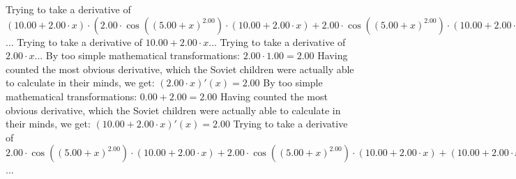 \documentclass{article}
\begin{document}
Trying to take a derivative of ${\left({{10.00} + {{2.00} \cdot {x}}}\right) \cdot \left({{{2.00} \cdot { \cos {\left({\left({{5.00} + {x}}\right) ^ {2.00}}\right)}  \cdot \left({{10.00} + {{2.00} \cdot {x}}}\right)}} + {{{2.00} \cdot { \cos {\left({\left({{5.00} + {x}}\right) ^ {2.00}}\right)}  \cdot \left({{10.00} + {{2.00} \cdot {x}}}\right)}} + {\left({{10.00} + {{2.00} \cdot {x}}}\right) \cdot \left({{\left({-1.00}\right) \cdot {\left({{10.00} + {{2.00} \cdot {x}}}\right) \cdot {\left({{10.00} + {{2.00} \cdot {x}}}\right) \cdot  \sin {\left({\left({{5.00} + {x}}\right) ^ {2.00}}\right)} }}} + {{2.00} \cdot  \cos {\left({\left({{5.00} + {x}}\right) ^ {2.00}}\right)} }}\right)}}}\right)}$...\newline
\newline
Trying to take a derivative of ${{10.00} + {{2.00} \cdot {x}}}$...\newline
\newline
Trying to take a derivative of ${{2.00} \cdot {x}}$...\newline
\newline
By too simple mathematical transformations:
 ${{2.00} \cdot {1.00}} = {2.00}$ 
 \newline
 \newline 
Having counted the most obvious derivative, which the Soviet children were actually able to calculate in their minds, we get:
$({{2.00} \cdot {x}})'(x) = {2.00}$\newline
\newline
By too simple mathematical transformations:
 ${{0.00} + {2.00}} = {2.00}$ 
 \newline
 \newline 
Having counted the most obvious derivative, which the Soviet children were actually able to calculate in their minds, we get:
$({{10.00} + {{2.00} \cdot {x}}})'(x) = {2.00}$\newline
\newline
Trying to take a derivative of ${{{2.00} \cdot { \cos {\left({\left({{5.00} + {x}}\right) ^ {2.00}}\right)}  \cdot \left({{10.00} + {{2.00} \cdot {x}}}\right)}} + {{{2.00} \cdot { \cos {\left({\left({{5.00} + {x}}\right) ^ {2.00}}\right)}  \cdot \left({{10.00} + {{2.00} \cdot {x}}}\right)}} + {\left({{10.00} + {{2.00} \cdot {x}}}\right) \cdot \left({{\left({-1.00}\right) \cdot {\left({{10.00} + {{2.00} \cdot {x}}}\right) \cdot {\left({{10.00} + {{2.00} \cdot {x}}}\right) \cdot  \sin {\left({\left({{5.00} + {x}}\right) ^ {2.00}}\right)} }}} + {{2.00} \cdot  \cos {\left({\left({{5.00} + {x}}\right) ^ {2.00}}\right)} }}\right)}}}$...\newline
\end{document}
